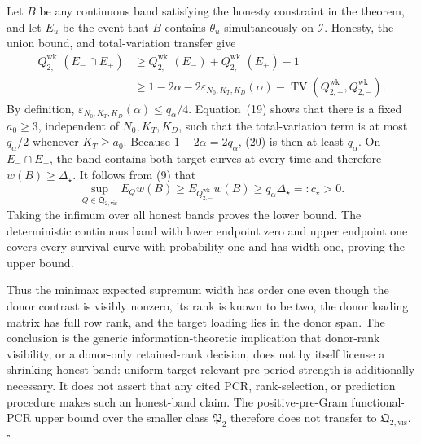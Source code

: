 Let \(B\) be any continuous band satisfying the honesty constraint in the theorem, and let \(E_u\) be the event that \(B\) contains \(\theta_u\) simultaneously on \(\mathcal I\).  Honesty, the union bound, and total-variation transfer give
\[
\begin{aligned}
 Q_{2,-}^{\mathrm{wk}}(E_-\cap E_+)
 &\ge Q_{2,-}^{\mathrm{wk}}(E_-)
      +Q_{2,-}^{\mathrm{wk}}(E_+)-1 \\
 &\ge 1-2\alpha-2\varepsilon_{N_0,K_T,K_D}(\alpha)
      -\operatorname{TV}(Q_{2,+}^{\mathrm{wk}},Q_{2,-}^{\mathrm{wk}}).
\end{aligned}
\tag{20}
\]
By definition, \(\varepsilon_{N_0,K_T,K_D}(\alpha)\le q_\alpha/4\).  Equation~(19) shows that there is a fixed \(a_0\ge3\), independent of \(N_0,K_T,K_D\), such that the total-variation term is at most \(q_\alpha/2\) whenever \(K_T\ge a_0\).  Because \(1-2\alpha=2q_\alpha\), (20) is then at least \(q_\alpha\).  On \(E_-\cap E_+\), the band contains both target curves at every time and therefore \(w(B)\ge\Delta_\star\).  It follows from (9) that
\[
 \sup_{Q\in\mathfrak Q_{2,\mathrm{vis}}}E_Qw(B)
 \ge E_{Q_{2,-}^{\mathrm{wk}}}w(B)
 \ge q_\alpha\Delta_\star=:c_\star>0.
 \tag{21}
\]
Taking the infimum over all honest bands proves the lower bound.  The deterministic continuous band with lower endpoint zero and upper endpoint one covers every survival curve with probability one and has width one, proving the upper bound.

Thus the minimax expected supremum width has order one even though the donor contrast is visibly nonzero, its rank is known to be two, the donor loading matrix has full row rank, and the target loading lies in the donor span.  The conclusion is the generic information-theoretic implication that donor-rank visibility, or a donor-only retained-rank decision, does not by itself license a shrinking honest band: uniform target-relevant pre-period strength is additionally necessary.  It does not assert that any cited PCR, rank-selection, or prediction procedure makes such an honest-band claim.  The positive-pre-Gram functional-PCR upper bound over the smaller class \(\mathfrak P_2\) therefore does not transfer to \(\mathfrak Q_{2,\mathrm{vis}}\). \(\square\)